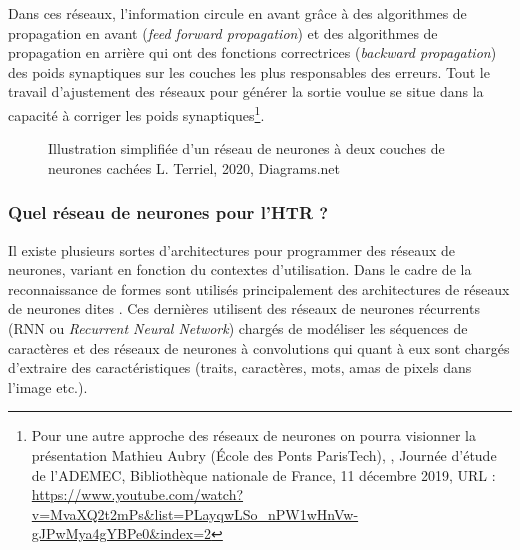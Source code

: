 Dans ces réseaux, l'information circule en avant grâce à des algorithmes de propagation en avant (\textit{feed forward propagation}) et des algorithmes de propagation en arrière qui ont des fonctions correctrices (\textit{backward propagation}) des poids synaptiques sur les couches les plus responsables des erreurs. Tout le travail d'ajustement des réseaux pour générer la sortie voulue se situe dans la capacité à corriger les poids synaptiques\footnote{Pour une autre approche des réseaux de neurones on pourra visionner la présentation Mathieu Aubry (École des Ponts ParisTech), , Journée d'étude  de l'ADEMEC, Bibliothèque nationale de France, 11 décembre 2019, URL : \url{https://www.youtube.com/watch?v=MvaXQ2t2mPs&list=PLayqwLSo_nPW1wHnVw-gJPwMya4gYBPe0&index=2}}.

\newpage
\begin{figure}[h]
    \centering
    \centerline{}
    \caption{Illustration simplifiée d'un réseau de neurones à deux couches de neurones cachées   \textcopyright L. Terriel, 2020, Diagrams.net}
    \label{fig:graph_neurones_artificiels}
\end{figure}

\subsubsection{Quel réseau de neurones pour l'HTR ?}     

Il existe plusieurs sortes d'architectures pour programmer des réseaux de neurones, variant en fonction du contextes d'utilisation. Dans le cadre de la reconnaissance de formes sont utilisés principalement des architectures de réseaux de neurones dites . Ces dernières utilisent des réseaux de neurones récurrents (RNN ou \textit{Recurrent Neural Network}) chargés de modéliser les séquences de caractères et des réseaux de neurones à convolutions qui quant à eux sont chargés d'extraire des caractéristiques (traits, caractères, mots, amas de pixels dans l'image etc.). 

